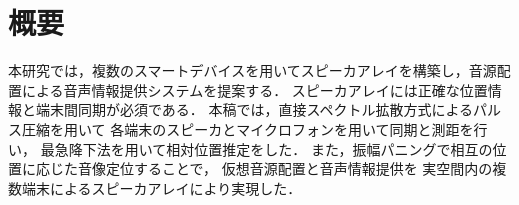 \chapter*{概要}

本研究では，複数のスマートデバイスを用いてスピーカアレイを構築し，音源配
置による音声情報提供システムを提案する．
スピーカアレイには正確な位置情報と端末間同期が必須である．
本稿では，直接スペクトル拡散方式によるパルス圧縮を用いて
各端末のスピーカとマイクロフォンを用いて同期と測距を行い，
最急降下法を用いて相対位置推定をした．
また，振幅パニングで相互の位置に応じた音像定位することで，
仮想音源配置と音声情報提供を
実空間内の複数端末によるスピーカアレイにより実現した．
